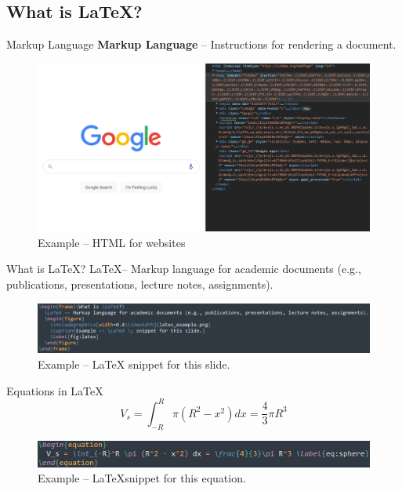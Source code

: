\documentclass{beamer}
\begin{document}
{\subsection{What is \LaTeX?}

  \begin{frame}{Markup Language}
    \textbf{Markup Language} -- Instructions for rendering a document.
    \begin{figure}
      \includegraphics[width=0.8\linewidth]{google_html.png}
      \caption{Example -- HTML for websites}
      \label{fig:html}
    \end{figure}
  \end{frame}

  \begin{frame}{What is \LaTeX?}
    \LaTeX -- Markup language for academic documents (e.g., publications, presentations, lecture notes, assignments).
    \begin{figure}
      \includegraphics[width=0.8\linewidth]{latex_example.png}
      \caption{Example -- \LaTeX \; snippet for this slide.}
      \label{fig:latex}
    \end{figure}
  \end{frame}


  \begin{frame}{Equations in \LaTeX}
    \begin{equation}
      V_s = \int_{-R}^R \pi (R^2 - x^2) dx = \frac{4}{3}\pi R^3 \label{eq:sphere}
    \end{equation}
    \begin{figure}
      \includegraphics[width=0.8\linewidth]{equation_example.png}
      \caption{Example -- \LaTeX snippet for this equation.}
      \label{fig:equation}
    \end{figure}
  \end{frame}

}
\end{document}
